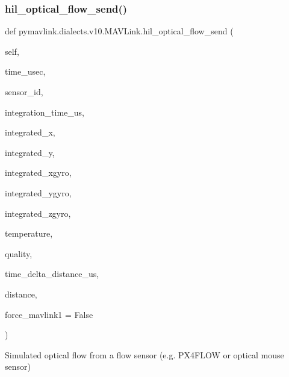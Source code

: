 \begin{DoxyVerb}
\begin{DoxyVerb}
\subsubsection{\texorpdfstring{hil\+\_\+optical\+\_\+flow\+\_\+send()}{hil\_optical\_flow\_send()}}
{\footnotesize\ttfamily def pymavlink.\+dialects.\+v10.\+M\+A\+V\+Link.\+hil\+\_\+optical\+\_\+flow\+\_\+send (\begin{DoxyParamCaption}\item[{}]{self,  }\item[{}]{time\+\_\+usec,  }\item[{}]{sensor\+\_\+id,  }\item[{}]{integration\+\_\+time\+\_\+us,  }\item[{}]{integrated\+\_\+x,  }\item[{}]{integrated\+\_\+y,  }\item[{}]{integrated\+\_\+xgyro,  }\item[{}]{integrated\+\_\+ygyro,  }\item[{}]{integrated\+\_\+zgyro,  }\item[{}]{temperature,  }\item[{}]{quality,  }\item[{}]{time\+\_\+delta\+\_\+distance\+\_\+us,  }\item[{}]{distance,  }\item[{}]{force\+\_\+mavlink1 = {\ttfamily False} }\end{DoxyParamCaption})}

\begin{DoxyVerb}Simulated optical flow from a flow sensor (e.g. PX4FLOW or optical
mouse sensor)


\end{DoxyVerb}
\end{DoxyVerb}
\end{DoxyVerb}

